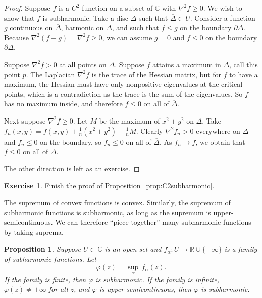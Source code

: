 \documentclass[12pt,openany]{book}
\newcommand{\C}{{\mathbb{C}}}
\newcommand{\R}{{\mathbb{R}}}
\newcommand{\myquote}[1]{``#1''}
\theoremstyle{plain}
\newtheorem{prop}[thm]{Proposition}
\theoremstyle{remark}
\theoremstyle{definition}
\newenvironment{exbox}{%
    \def\FrameCommand{\vrule width 1pt \relax\hspace{10pt}}%
    \MakeFramed{\advance\hsize-\width\FrameRestore}%
}{%
    \endMakeFramed
}
\theoremstyle{exercise}
\newtheorem{exercise}{Exercise}[section]
\theoremstyle{example}
\newcommand{\propref}[1]{\hyperref[#1]{Proposition~\ref*{#1}}}
\begin{document}
\begin{proof}
Suppose $f$ is a $C^2$ function on a subset of $\C$
with $\nabla^2 f \geq 0$.  We wish to show that $f$ is subharmonic.
Take a disc $\Delta$ such that $\overline{\Delta} \subset U$.
Consider a function
$g$ continuous on $\overline{\Delta}$,
harmonic on $\Delta$, and such that
$f \leq g$ on the boundary $\partial \Delta$.  Because
$\nabla^2 (f-g) = \nabla^2 f \geq 0$, we can assume $g = 0$ and $f \leq 0$
on the boundary $\partial \Delta$. 

Suppose $\nabla^2 f > 0$ at all points on $\Delta$.
Suppose $f$ attains a maximum in $\Delta$,
call this point $p$.  
The Laplacian $\nabla^2 f$ is the trace of the Hessian matrix, but for $f$ to have a
maximum, the Hessian must have only nonpositive eigenvalues at the critical
points, which is a
contradiction as the trace is the sum of the eigenvalues.  So $f$ has no
maximum inside, and therefore $f \leq 0$ on all of
$\overline{\Delta}$.

Next suppose $\nabla^2 f \geq 0$.
Let $M$ be the maximum of $x^2+y^2$ on $\overline{\Delta}$.
Take $f_n(x,y) = f(x,y) + \frac{1}{n}
( x^2+y^2 ) - \frac{1}{n}M$.  Clearly $\nabla^2 f_n > 0$ everywhere on
$\Delta$ and
$f_n \leq 0$ on the boundary, so $f_n \leq 0$ 
on all of $\overline{\Delta}$.  As $f_n \to f$, we obtain that
$f \leq 0$ on all of $\overline{\Delta}$.

The other direction is left as an exercise.
\end{proof}

\begin{exbox}
\begin{exercise}
Finish the proof of \propref{prop:C2subharmonic}.
\end{exercise}
\end{exbox}

The supremum of convex functions is convex.
Similarly,
the supremum of subharmonic functions is subharmonic, as long as
the supremum is upper-semicontinuous.  We can therefore
\myquote{piece together}
many subharmonic functions by taking suprema.

\begin{prop}
Suppose $U \subset \C$ is an open set and $f_\alpha \colon U \to \R \cup \{ -\infty \}$
is a family of subharmonic functions.  Let
\begin{equation*}
\varphi(z) = \sup_\alpha\, f_\alpha(z) .
\end{equation*}
If the family is finite, then $\varphi$ is subharmonic.
If the family is infinite, $\varphi(z) \not= +\infty$ for
all $z$, and $\varphi$
is upper-semicontinuous, then $\varphi$ is subharmonic.
\end{prop}
\end{document}
